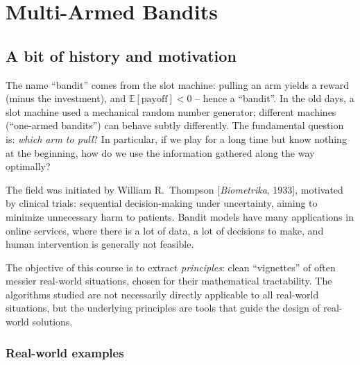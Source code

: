 

\section{Multi-Armed Bandits}

\subsection{A bit of history and motivation}

The name ``bandit'' comes from the slot machine: pulling an arm yields a reward (minus the investment), and $\mathbb{E}[\text{payoff}] < 0$ -- hence a ``bandit''. In the old days, a slot machine used a mechanical random number generator; different machines (``one-armed bandits'') can behave subtly differently. The fundamental question is: \emph{which arm to pull}? In particular, if we play for a long time but know nothing at the beginning, how do we use the information gathered along the way optimally?

The field was initiated by William R.\ Thompson [\textit{Biometrika}, 1933], motivated by clinical trials: sequential decision-making under uncertainty, aiming to minimize unnecessary harm to patients. Bandit models have many applications in online services, where there is a lot of data, a lot of decisions to make, and human intervention is generally not feasible.

\begin{remark}
The objective of this course is to extract \emph{principles}: clean ``vignettes'' of often messier real-world situations, chosen for their mathematical tractability. The algorithms studied are not necessarily directly applicable to all real-world situations, but the underlying principles are tools that guide the design of real-world solutions.
\end{remark}

\subsubsection*{Real-world examples}

